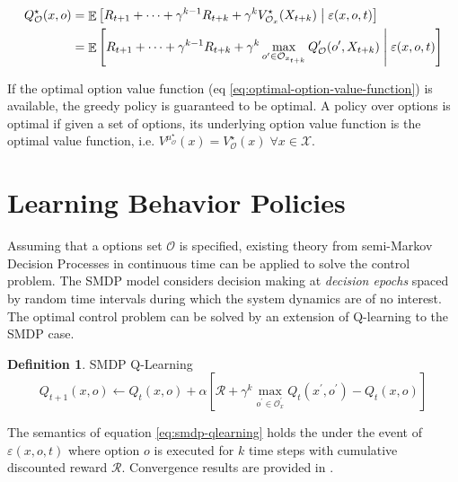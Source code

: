 \documentclass[12pt, oneside, extrafontsizes]{memoir}  %
\newcommand{\mdps}{Markov Decision Processes\xspace}
\def\given{\;\middle\vert\;}
\def\optimal{\star}
\DeclareMathOperator{\expectation}{\mathbb{E}}
\theoremstyle{plain}
\theoremstyle{definition}
\newtheorem{defn}{Definition}[section]
\begin{document}
\begin{align}
Q_{\mathcal{O}}^\optimal(x, o) &= \expectation \left[ R_{t+1} + \dots +
\gamma^{k-1}R_{t+k} + \gamma^k V_{\mathcal{O}_x}^\optimal(X_{t+k})  \given
\varepsilon(x, o, t) \right] \notag \\
&= \expectation \left[ R_{t+1} + \dots + \gamma^{k-1}R_{t+k} + \gamma^k
\max_{o^\prime \in \mathcal{O}_{x_{t+k}}} Q_\mathcal{O}^\prime(o^\prime, X_{t+k}) 
\given \varepsilon(x, o, t) \right]
\label{eq:optimal-option-value-function}
\end{align}

If the optimal option value function (eq \ref{eq:optimal-option-value-function}) is
available, the greedy policy is guaranteed to be optimal. A policy over options is
optimal if given a set of options, its underlying option value function is the optimal
value function, i.e. $V^{\mu_\mathcal{O}^\optimal}(x) = V_\mathcal{O}^\optimal(x)\;
\forall x \in \mathcal{X}$.

\section{Learning Behavior Policies}

Assuming that a options set $\mathcal{O}$ is specified, existing theory
\cite{Puterman1994, Bradtke1994} from semi-\mdps in continuous time can be
applied to solve the control problem. The SMDP model considers decision making at
\textit{decision epochs} spaced by random time intervals during which the system
dynamics are of no interest. The optimal control problem can be solved by an
extension of Q-learning to the SMDP case.

\begin{defn}{SMDP Q-Learning}
\begin{equation}
Q_{t+1}(x, o) \leftarrow Q_{t}(x, o) + \alpha \left[ \mathcal{R} + \gamma^k
\max_{o^\prime \in \mathcal{O}_x^\prime} Q_{t}(x^\prime, o^\prime) -
Q_t(x, o) \right]
\label{eq:smdp-qlearning}
\end{equation}
\end{defn}

The semantics of equation \ref{eq:smdp-qlearning} holds the under the event of
$\varepsilon(x, o, t)$ where option $o$ is executed for $k$ time steps with cumulative
discounted reward $\mathcal{R}$. Convergence results are provided in \cite{Parr1998}.
\end{document}
